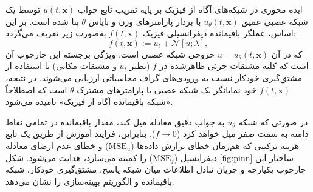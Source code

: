 ایده محوری در شبکه‌های آگاه از فیزیک بر پایه تقریب تابع جواب $u(t,\mathbf{x})$ توسط یک شبکه عصبی عمیق $u_\theta(t,\mathbf{x})$ با بردار پارامترهای وزن و بایاس $\theta$ بنا شده است. بر این اساس، عملگر باقیمانده دیفرانسیلی فیزیک $f(t,\mathbf{x})$ به‌صورت زیر تعریف می‌گردد:
\begin{equation}
f(t,\mathbf{x}) := u_t + \mathcal{N}[u; \lambda],
\label{eq:residual}
\end{equation}
که در آن $u = u_\theta(t,\mathbf{x})$ خروجی شبکه عصبی است. ویژگی برجسته این چارچوب آن است که کلیه مشتقات جزئی ظاهرشده در $f$ (نظیر $u_t$ و مشتقات مکانی) با استفاده از مشتق‌گیری خودکار نسبت به ورودی‌های گراف محاسباتی ارزیابی می‌شوند. در نتیجه، $f(t,\mathbf{x})$ خود نمایانگر یک شبکه عصبی با پارامترهای مشترک $\theta$ است که اصطلاحاً «شبکه باقیمانده آگاه از فیزیک» نامیده می‌شود.

در صورتی که شبکه $u_\theta$ به جواب دقیق معادله میل کند، مقدار باقیمانده در تمامی نقاط دامنه به سمت صفر میل خواهد کرد ($f \to 0$). بنابراین، فرایند آموزش از طریق یک تابع هزینه ترکیبی که هم‌زمان خطای برازش داده‌ها ($\mathrm{MSE}_u$) و خطای عدم ارضای معادله دیفرانسیل ($\mathrm{MSE}_f$) را کمینه می‌سازد، هدایت می‌شود. شکل \ref{fig:pinn} ساختار این چارچوب یکپارچه و جریان تبادل اطلاعات میان شبکه پاسخ، مشتق‌گیری خودکار، شبکه باقیمانده و الگوریتم بهینه‌سازی را نشان می‌دهد.

